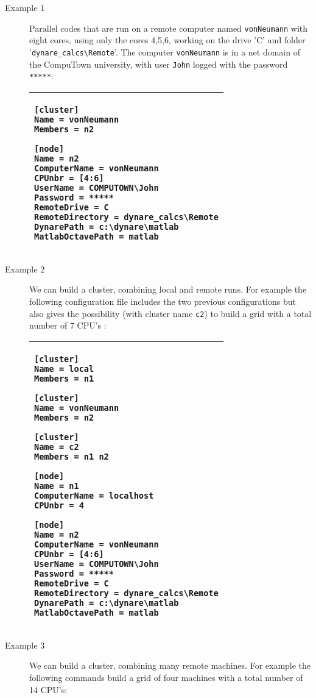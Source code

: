 \documentclass[12pt,a4paper,pdftex]{article}
\begin{document}
\begin{description}
\item[Example 1] Parallel codes that are run on a remote computer named \verb"vonNeumann" with eight cores, using only the cores 4,5,6, working on the drive 'C' and folder '\verb"dynare_calcs\Remote"'. The computer \verb"vonNeumann" is in a net domain of the CompuTown university, with user \verb"John" logged with the password \verb"*****":

\singlespacing
{\footnotesize
\hspace{2cm}\begin{tabular}[b]{| p{8cm} |}
  \hline
\begin{verbatim}
[cluster]
Name = vonNeumann
Members = n2

[node]
Name = n2
ComputerName = vonNeumann
CPUnbr = [4:6]
UserName = COMPUTOWN\John
Password = *****
RemoteDrive = C
RemoteDirectory = dynare_calcs\Remote
DynarePath = c:\dynare\matlab
MatlabOctavePath = matlab
\end{verbatim}
\\ \hline
\end{tabular}
}
\doublespacing

\item[Example 2] We can build a cluster, combining local and remote runs. For example the following configuration file includes the two previous configurations but also gives the possibility (with cluster name \verb"c2") to build a grid with a total number of 7 CPU's :

\singlespacing
{\footnotesize
\hspace{2cm}\begin{tabular}[b]{| p{8cm} |}
  \hline
\begin{verbatim}
[cluster]
Name = local
Members = n1

[cluster]
Name = vonNeumann
Members = n2

[cluster]
Name = c2
Members = n1 n2

[node]
Name = n1
ComputerName = localhost
CPUnbr = 4

[node]
Name = n2
ComputerName = vonNeumann
CPUnbr = [4:6]
UserName = COMPUTOWN\John
Password = *****
RemoteDrive = C
RemoteDirectory = dynare_calcs\Remote
DynarePath = c:\dynare\matlab
MatlabOctavePath = matlab
\end{verbatim}
\\ \hline
\end{tabular}
}
\doublespacing
\item[Example 3] We can build a cluster, combining many remote machines. For example the following commands build a grid of four machines with a total number of 14 CPU's:


\end{description}
\end{document}
